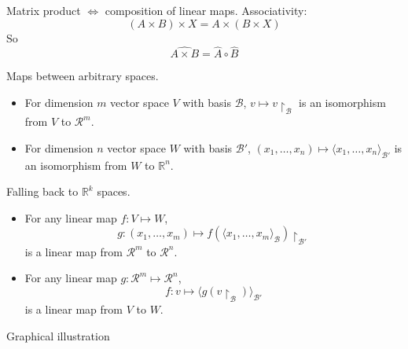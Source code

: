 \documentclass{beamer}
\begin{document}
\begin{frame}{Matrix product $\Leftrightarrow$ composition of linear maps.}
  Associativity:
  \[ (A \times B)\times X = A \times (B \times X) \]
  So
  \[\widehat{A \times B} = \widehat{A} \circ \widehat{B} \]
\end{frame}

\begin{frame}{Maps between arbitrary spaces.}
  \begin{itemize}
  \item For dimension $m$ vector space $V$ with basis $\mathcal{B}$, $v \mapsto v \restriction_{\mathcal{B}}$ is an isomorphism from $V$ to $\mathcal{R}^m$.
  \item For dimension $n$ vector space $W$ with basis $\mathcal{B}'$, $(x_1, \dots, x_n) \mapsto \langle x_1, \dots, x_n \rangle_{\mathcal{B}'}$ is an isomorphism from $W$ to $\mathbb{R}^n$.
  \end{itemize}

  \begin{block}{Falling back to $\mathbb{R}^k$ spaces.}
    \begin{itemize}
    \item For any linear map $f: V \mapsto W$, \[g: (x_1, \dots, x_m) \mapsto f(\langle x_1, \dots, x_m \rangle_{\mathcal{B}}) \restriction_{\mathcal{B'}}\] is a linear map from $\mathcal{R}^m$ to $\mathcal{R}^n$.
    \item For any linear map $g: \mathcal{R}^m \mapsto \mathcal{R}^n$,
      \[f: v \mapsto \langle g(v \restriction_{\mathcal{B}}) \rangle_{\mathcal{B}'}\] is a linear map from $V$ to $W$.
    \end{itemize}
  \end{block}
  
\end{frame}

\begin{frame}{Graphical illustration}
  \begin{center}
  \end{center}
\end{frame}
\end{document}
